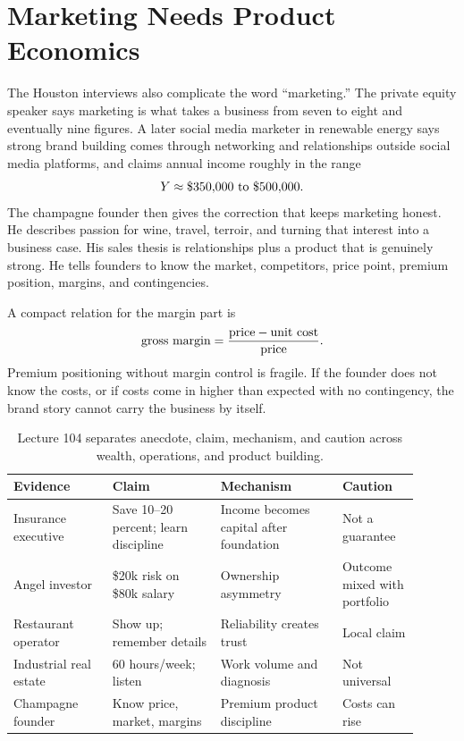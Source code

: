 \documentclass[11pt,oneside]{book}
\begin{document}
\section{Marketing Needs Product Economics}

The Houston interviews also complicate the word ``marketing.'' The private equity speaker says marketing is what takes a business from seven to eight and eventually nine figures. A later social media marketer in renewable energy says strong brand building comes through networking and relationships outside social media platforms, and claims annual income roughly in the range
\[
Y\approx \$350{,}000\hbox{ to }\$500{,}000.
\]
The champagne founder then gives the correction that keeps marketing honest. He describes passion for wine, travel, terroir, and turning that interest into a business case. His sales thesis is relationships plus a product that is genuinely strong. He tells founders to know the market, competitors, price point, premium position, margins, and contingencies.

A compact relation for the margin part is
\[
\hbox{gross margin}
=
\frac{\hbox{price}-\hbox{unit cost}}{\hbox{price}}.
\]
Premium positioning without margin control is fragile. If the founder does not know the costs, or if costs come in higher than expected with no contingency, the brand story cannot carry the business by itself.

\begin{table}
\centering
\small
\begin{tabular}{p{0.22\linewidth}p{0.24\linewidth}p{0.27\linewidth}p{0.17\linewidth}}
\hline
Evidence & Claim & Mechanism & Caution\\
\hline
Insurance executive & Save 10--20 percent; learn discipline & Income becomes capital after foundation & Not a guarantee\\
Angel investor & \$20k risk on \$80k salary & Ownership asymmetry & Outcome mixed with portfolio\\
Restaurant operator & Show up; remember details & Reliability creates trust & Local claim\\
Industrial real estate & 60 hours/week; listen & Work volume and diagnosis & Not universal\\
Champagne founder & Know price, market, margins & Premium product discipline & Costs can rise\\
\hline
\end{tabular}
\caption{Lecture 104 separates anecdote, claim, mechanism, and caution across wealth, operations, and product building.}
\end{table}
\end{document}
